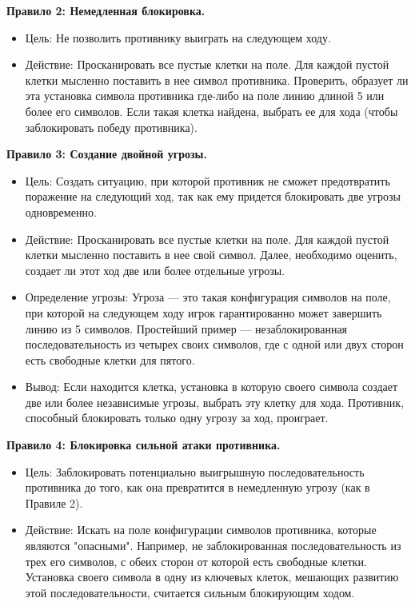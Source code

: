 \documentclass[a4paper]{article}
\begin{document}
\textbf{Правило 2: Немедленная блокировка.}

\begin{itemize}
	\item Цель: Не позволить противнику выиграть на следующем ходу.
	\item Действие: Просканировать все пустые клетки на поле. Для каждой пустой клетки мысленно поставить в нее символ противника. Проверить, образует ли эта установка символа противника где-либо на поле линию длиной 5 или более его символов. Если такая клетка найдена, выбрать ее для хода (чтобы заблокировать победу противника).
	
\end{itemize}

\textbf{Правило 3: Создание двойной угрозы.}

\begin{itemize}
	\item Цель: Создать ситуацию, при которой противник не сможет предотвратить поражение на следующий ход, так как ему придется блокировать две угрозы одновременно.
	\item Действие: Просканировать все пустые клетки на поле. Для каждой пустой клетки мысленно поставить в нее свой символ. Далее, необходимо оценить, создает ли этот ход две или более отдельные угрозы.
	
	\item Определение угрозы: Угроза — это такая конфигурация символов на поле, при которой на следующем ходу игрок гарантированно может завершить линию из 5 символов. Простейший пример — незаблокированная последовательность из четырех своих символов, где с одной или двух сторон есть свободные клетки для пятого.
	
	\item Вывод: Если находится клетка, установка в которую своего символа создает две или более независимые угрозы, выбрать эту клетку для хода. Противник, способный блокировать только одну угрозу за ход, проиграет.
	
\end{itemize}



\textbf{Правило 4: Блокировка сильной атаки противника.}

\begin{itemize}
	\item Цель: Заблокировать потенциально выигрышную последовательность противника до того, как она превратится в немедленную угрозу (как в Правиле 2).
	
	\item Действие: Искать на поле конфигурации символов противника, которые являются "опасными". Например, не заблокированная последовательность из трех его символов, с обеих сторон от которой есть свободные клетки. Установка своего символа в одну из ключевых клеток, мешающих развитию этой последовательности, считается сильным блокирующим ходом.
	
\end{itemize}
\end{document}
